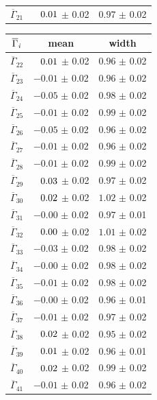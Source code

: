 \begin{table}[!tb]
\begin{tabular}{l|c|c}
$\overline{\Gamma}_{21}$ & $\hphantom{-}0.01$ $\pm$ 0.02 & $0.97$ $\pm$ 0.02 \\ 
\end{tabular}
\hspace{1em}
\begin{tabular}{c|c|c}
$\overline{\Gamma}_{\it{i}}$ & mean & width \\ 
\hline
$\overline{\Gamma}_{22}$ & $\hphantom{-}0.01$ $\pm$ 0.02 & $0.96$ $\pm$ 0.02 \\ 
$\overline{\Gamma}_{23}$ & $-0.01$ $\pm$ 0.02 & $0.96$ $\pm$ 0.02 \\ 
$\overline{\Gamma}_{24}$ & $-0.05$ $\pm$ 0.02 & $0.98$ $\pm$ 0.02 \\ 
$\overline{\Gamma}_{25}$ & $-0.01$ $\pm$ 0.02 & $0.99$ $\pm$ 0.02 \\ 
$\overline{\Gamma}_{26}$ & $-0.05$ $\pm$ 0.02 & $0.96$ $\pm$ 0.02 \\ 
$\overline{\Gamma}_{27}$ & $-0.01$ $\pm$ 0.02 & $0.96$ $\pm$ 0.02 \\ 
$\overline{\Gamma}_{28}$ & $-0.01$ $\pm$ 0.02 & $0.99$ $\pm$ 0.02 \\ 
$\overline{\Gamma}_{29}$ & $\hphantom{-}0.03$ $\pm$ 0.02 & $0.97$ $\pm$ 0.02 \\ 
$\overline{\Gamma}_{30}$ & $\hphantom{-}0.02$ $\pm$ 0.02 & $1.02$ $\pm$ 0.02 \\ 
$\overline{\Gamma}_{31}$ & $-0.00$ $\pm$ 0.02 & $0.97$ $\pm$ 0.01 \\ 
$\overline{\Gamma}_{32}$ & $\hphantom{-}0.00$ $\pm$ 0.02 & $1.01$ $\pm$ 0.02 \\ 
$\overline{\Gamma}_{33}$ & $-0.03$ $\pm$ 0.02 & $0.98$ $\pm$ 0.02 \\ 
$\overline{\Gamma}_{34}$ & $-0.00$ $\pm$ 0.02 & $0.98$ $\pm$ 0.02 \\ 
$\overline{\Gamma}_{35}$ & $-0.01$ $\pm$ 0.02 & $0.98$ $\pm$ 0.02 \\ 
$\overline{\Gamma}_{36}$ & $-0.00$ $\pm$ 0.02 & $0.96$ $\pm$ 0.01 \\ 
$\overline{\Gamma}_{37}$ & $-0.01$ $\pm$ 0.02 & $0.97$ $\pm$ 0.02 \\ 
$\overline{\Gamma}_{38}$ & $\hphantom{-}0.02$ $\pm$ 0.02 & $0.95$ $\pm$ 0.02 \\ 
$\overline{\Gamma}_{39}$ & $\hphantom{-}0.01$ $\pm$ 0.02 & $0.96$ $\pm$ 0.01 \\ 
$\overline{\Gamma}_{40}$ & $\hphantom{-}0.02$ $\pm$ 0.02 & $0.99$ $\pm$ 0.02 \\ 
$\overline{\Gamma}_{41}$ & $-0.01$ $\pm$ 0.02 & $0.96$ $\pm$ 0.02 \\ 
\end{tabular}
\label{table:spd:toy_pulls}
\end{table}

